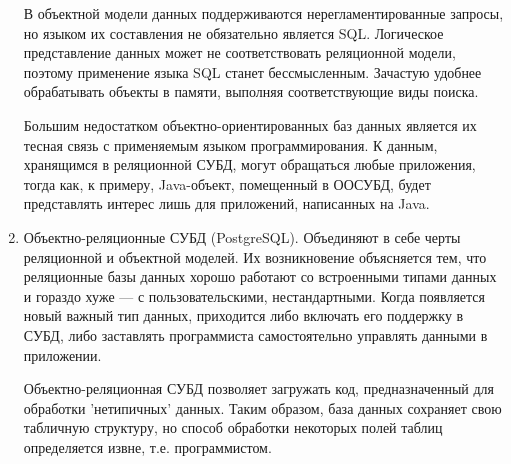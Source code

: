 \documentclass[12pt,a4paper,oneside]{article} %
\begin{document}
\begin{enumerate}
В объектной модели данных поддерживаются нерегламентированные \linebreak
запросы, но языком их составления не обязательно является SQL. \linebreak
Логическое представление данных может не соответствовать \linebreak
реляционной модели, поэтому применение языка SQL станет \linebreak
бессмысленным. Зачастую удобнее обрабатывать объекты в памяти, \linebreak
выполняя соответствующие виды поиска.

Большим недостатком объектно-ориентированных баз данных является \linebreak
их тесная связь с применяемым языком программирования. К данным, \linebreak
хранящимся в реляционной СУБД, могут обращаться любые \linebreak
приложения, тогда как, к примеру, Java-объект, помещенный \linebreak
в ООСУБД, будет представлять интерес лишь для приложений, \linebreak
написанных на Java.

\item Объектно-реляционные СУБД (PostgreSQL). Объединяют в себе черты \linebreak
реляционной и объектной моделей. Их возникновение объясняется тем, \linebreak
что реляционные базы данных хорошо работают со встроенными типами \linebreak
данных и гораздо хуже — с пользовательскими, нестандартными. \linebreak
Когда появляется новый важный тип данных, приходится либо включать \linebreak
его поддержку в СУБД, либо заставлять программиста \linebreak
самостоятельно управлять данными в приложении.

Объектно-реляционная СУБД позволяет загружать код, \linebreak
предназначенный для обработки 'нетипичных' данных. \linebreak
Таким образом, база данных сохраняет свою табличную структуру, \linebreak
но способ обработки некоторых полей таблиц определяется извне, \linebreak
т.е. программистом.
\end{enumerate}
\end{document}
